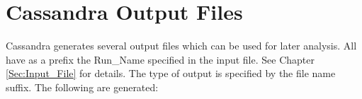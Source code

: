 
\section{Cassandra Output Files}

Cassandra generates several output files which can be used for later analysis. All have as a prefix the Run\_Name specified in the input file. See Chapter \ref{Sec:Input_File} for details. The type of output is specified by the file name suffix. The following are generated:

